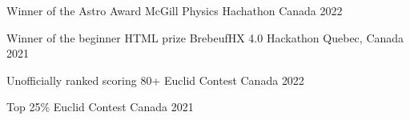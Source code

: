 



\begin{cvhonors}

  \cvhonor
    {Winner of the Astro Award} %
    {McGill Physics Hachathon} %
    {Canada} %
    {2022} %

  \cvhonor
    {Winner of the beginner HTML prize} %
    {BrebeufHX 4.0 Hackathon} %
    {Quebec, Canada} %
    {2021} %






  \cvhonor
    {Unofficially ranked scoring 80+} %
    {Euclid Contest} %
    {Canada} %
    {2022} %
    
  \cvhonor
    {Top 25\%} %
    {Euclid Contest} %
    {Canada} %
    {2021} %
    




\end{cvhonors}
